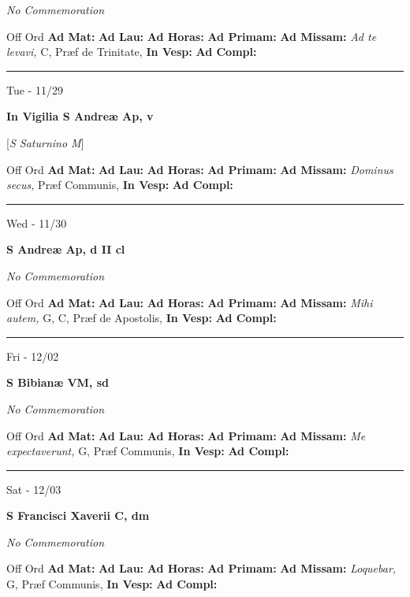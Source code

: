 \documentclass[letterpaper, 10pt]{article}
\begin{document}
\textit{No Commemoration}\begin{justify}
Off Ord
\textbf{Ad Mat: }
\textbf{Ad Lau: }
\textbf{Ad Horas: }
\textbf{Ad Primam: }
\textbf{Ad Missam:} \textit{Ad te levavi, } C, Præf de Trinitate, 
\textbf{In Vesp: }
\textbf{Ad Compl: }\end{justify}



\hrule
\begin{center}
Tue - 11/29
\end{center}\textbf{ \large In Vigilia S Andreæ Ap, \textnormal{\normalsize v}}

[\textit{S Saturnino M}]
\begin{justify}
Off Ord
\textbf{Ad Mat: }
\textbf{Ad Lau: }
\textbf{Ad Horas: }
\textbf{Ad Primam: }
\textbf{Ad Missam:} \textit{Dominus secus, } Præf Communis, 
\textbf{In Vesp: }
\textbf{Ad Compl: }\end{justify}



\hrule
\begin{center}
Wed - 11/30
\end{center}\textbf{ \large S Andreæ Ap, \textnormal{\normalsize d II cl}}

\textit{No Commemoration}\begin{justify}
Off Ord
\textbf{Ad Mat: }
\textbf{Ad Lau: }
\textbf{Ad Horas: }
\textbf{Ad Primam: }
\textbf{Ad Missam:} \textit{Mihi autem, } G, C, Præf de Apostolis, 
\textbf{In Vesp: }
\textbf{Ad Compl: }\end{justify}



\hrule
\begin{center}
Fri - 12/02
\end{center}\textbf{ \large S Bibianæ VM, \textnormal{\normalsize sd}}

\textit{No Commemoration}\begin{justify}
Off Ord
\textbf{Ad Mat: }
\textbf{Ad Lau: }
\textbf{Ad Horas: }
\textbf{Ad Primam: }
\textbf{Ad Missam:} \textit{Me expectaverunt, } G, Præf Communis, 
\textbf{In Vesp: }
\textbf{Ad Compl: }\end{justify}



\hrule
\begin{center}
Sat - 12/03
\end{center}\textbf{ \large S Francisci Xaverii C, \textnormal{\normalsize dm}}

\textit{No Commemoration}\begin{justify}
Off Ord
\textbf{Ad Mat: }
\textbf{Ad Lau: }
\textbf{Ad Horas: }
\textbf{Ad Primam: }
\textbf{Ad Missam:} \textit{Loquebar, } G, Præf Communis, 
\textbf{In Vesp: }
\textbf{Ad Compl: }\end{justify}
\end{document}
